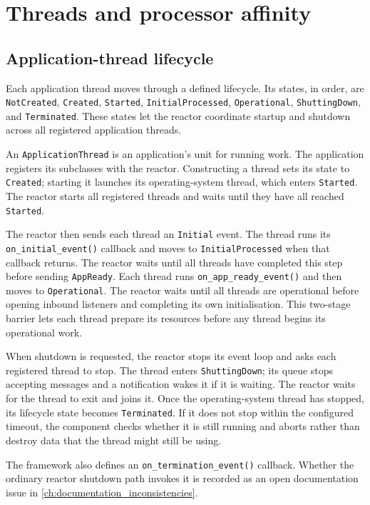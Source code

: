 \section{Threads and processor affinity}
\label{sec:fw_threads}

\subsection{Application-thread lifecycle}

Each application thread moves through a defined lifecycle. Its states, in
order, are \texttt{NotCreated}, \texttt{Created}, \texttt{Started},
\texttt{InitialProcessed}, \texttt{Operational}, \texttt{ShuttingDown}, and
\texttt{Terminated}. These states let the reactor coordinate startup and
shutdown across all registered application threads.

An \texttt{ApplicationThread} is an application's unit for running work. The
application registers its subclasses with the reactor. Constructing a thread
sets its state to \texttt{Created}; starting it launches its operating-system
thread, which enters \texttt{Started}. The reactor starts all registered
threads and waits until they have all reached \texttt{Started}.

The reactor then sends each thread an \texttt{Initial} event. The thread runs
its \texttt{on\_initial\_event()} callback and moves to
\texttt{InitialProcessed} when that callback returns. The reactor waits until
all threads have completed this step before sending \texttt{AppReady}. Each
thread runs \texttt{on\_app\_ready\_event()} and then moves to
\texttt{Operational}. The reactor waits until all threads are operational
before opening inbound listeners and completing its own initialisation. This
two-stage barrier lets each thread prepare its resources before any thread
begins its operational work.

When shutdown is requested, the reactor stops its event loop and asks each
registered thread to stop. The thread enters \texttt{ShuttingDown}; its queue
stops accepting messages and a notification wakes it if it is waiting. The
reactor waits for the thread to exit and joins it. Once the operating-system
thread has stopped, its lifecycle state becomes \texttt{Terminated}. If it
does not stop within the configured timeout, the component checks whether it
is still running and aborts rather than destroy data that the thread might
still be using.

The framework also defines an \texttt{on\_termination\_event()} callback.
Whether the ordinary reactor shutdown path invokes it is recorded as an open
documentation issue in \cref{ch:documentation_inconsistencies}.

